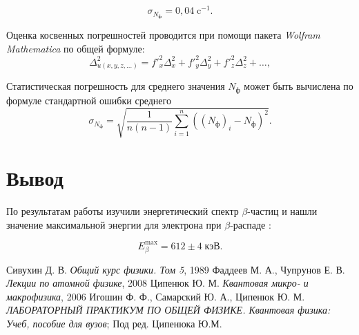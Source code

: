 \documentclass[a4paper, 12pt]{article}%
\newcommand{\btt}{$\beta $}
\begin{document}
		\begin{equation*}\label{key}
			\sigma_{N_{\text{ф}}} = 0,04 \;\text{c}^{-1}.
		\end{equation*}
		
	Оценка косвенных погрешностей проводится при помощи пакета \emph{Wolfram Mathematica} по общей формуле:
	\begin{equation}\label{eq:погрешности}
		\Delta_{u(x, y, z, \ldots)}^2 = f'^2_{x} \Delta_x^2 + f'^2_y \Delta_y^2 + f'^2_z \Delta_z^2 + \ldots,
	\end{equation}
	
	Статистическая погрешность для среднего значения $ N_\text{ф} $ может быть вычислена по формуле стандартной ошибки среднего
	\begin{equation}\label{eq:stat}
		\sigma_{N_{\text{ф}}} = \sqrt{\dfrac{1}{n (n-1)} \sum_{i=1}^{n}\left( (N_{\text{ф}})_i - N_{\text{ф}} \right)^2 }.
	\end{equation}
	
	\section{Вывод}
	
	По результатам работы изучили энергетический спектр \btt-частиц и нашли значение максимальной энергии для электрона при \btt-распаде :
	
	\[E_\beta^\mathrm{max} = 612\pm 4 \; \text{кэВ}.\]


	\begin{thebibliography}{3}
		 Сивухин Д. В. \emph{Общий курс физики. Том 5}, 1989
		 Фаддеев М. А., Чупрунов Е. В. \emph{Лекции по атомной физике}, 2008
		 Ципенюк Ю. М. \emph{Квантовая микро- и макрофизика}, 2006
		 Игошин Ф. Ф., Самарский Ю. А., Ципенюк Ю. М. \emph{ЛАБОРАТОРНЫЙ ПРАКТИКУМ ПО ОБЩЕЙ ФИЗИКЕ. Квантовая физика: Учеб, пособие для вузов}; Под ред. Ципенюка Ю.М.
	\end{thebibliography}
\end{document}

